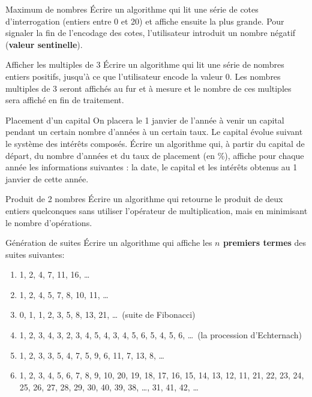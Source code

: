 \begin{Exercice}{Maximum de nombres}
	Écrire un algorithme qui lit une série de cotes d’interrogation (entiers
	entre 0 et 20) et affiche ensuite la plus grande. Pour signaler la fin
	de l’encodage des cotes, l’utilisateur introduit un nombre négatif
	(\textbf{valeur sentinelle}).
\end{Exercice}

\begin{Exercice}{Afficher les multiples de 3}
	Écrire un algorithme qui lit une série de nombres entiers positifs,
	jusqu’à ce que l’utilisateur encode la valeur 0. Les nombres multiples
	de 3 seront affichés au fur et à mesure et le nombre de ces multiples
	sera affiché en fin de traitement.
\end{Exercice}

\begin{Exercice}{Placement d'un capital}
	On placera le 1 janvier de l’année à venir un
	capital pendant un certain nombre d’années à un certain taux. Le
	capital évolue suivant le système des intérêts composés. Écrire un
	algorithme qui, à partir du capital de départ, du nombre d’années et du
	taux de placement (en \%), affiche pour chaque année les informations
	suivantes : la date, le capital et les intérêts obtenus au
	1 janvier de cette année.
\end{Exercice}

\bigskip
\begin{Exercice}{Produit de 2 nombres}
	Écrire un algorithme qui retourne le produit de deux entiers quelconques
	sans utiliser l’opérateur de multiplication, mais en minimisant le
	nombre d’opérations.
\end{Exercice}

\begin{Exercice}{Génération de suites}
	Écrire un algorithme qui affiche les \textbf{$n$ premiers termes} des
	suites suivantes:

	\begin{enumerate}[label=\alph*)]
	\item {
	1, 2, 4, 7, 11, 16, \dots}
	\item {
	1, 2, 4, 5, 7, 8, 10, 11, \dots}
	\item {
	0, 1, 1, 2, 3, 5, 8, 13, 21, \dots\ (suite de Fibonacci)}
	\item {
	1, 2, 3, 4, 3, 2, 3, 4, 5, 4, 3, 4, 5, 6, 5, 4, 5, 6, \dots\ 
	(la procession d'Echternach)}
	\item {
	1, 2, 3, 3, 5, 4, 7, 5, 9, 6, 11, 7, 13, 8, \dots }
	\item {
	1, 2, 3, 4, 5, 6, 7, 8, 9, 10, 20, 19, 18, 17, 16, 15, 14, 13, 12, 11,
	21, 22, 23, 24, 25, 26, 27, 28, 29, 30, 40, 39, 38, \dots, 31, 41, 42, \dots}
	\end{enumerate}
\end{Exercice}


